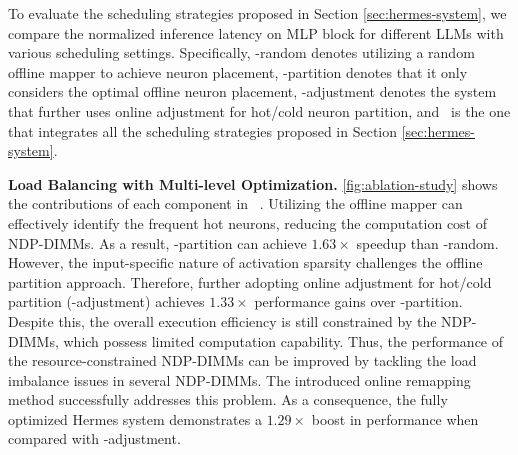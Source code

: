 To evaluate the scheduling strategies proposed in Section \ref{sec:hermes-system}, we compare the normalized inference latency on MLP block for different LLMs with various scheduling settings. Specifically, \name-random denotes utilizing a random offline mapper to achieve neuron placement, \name-partition denotes that it only considers the optimal offline neuron placement, \name-adjustment denotes the system that further uses online adjustment for hot/cold neuron partition, and \name~is the one that integrates all the scheduling strategies proposed in Section \ref{sec:hermes-system}.  

\textbf{Load Balancing with Multi-level Optimization. } \fig \ref{fig:ablation-study} shows the contributions of each component in \name~. Utilizing the offline mapper can effectively identify the frequent hot neurons, reducing the computation cost of NDP-DIMMs. As a result, \name-partition can achieve $1.63 \times$ speedup than \name-random. However, the input-specific nature of activation sparsity challenges the offline partition approach. Therefore, further adopting online adjustment for hot/cold partition (\name-adjustment) achieves $1.33 \times$ performance gains over \name-partition. Despite this, the overall execution efficiency is still constrained by the NDP-DIMMs, which possess limited computation capability. Thus, the performance of the resource-constrained NDP-DIMMs can be improved by tackling the load imbalance issues in several NDP-DIMMs. The introduced online remapping method successfully addresses this problem. As a consequence,
the fully optimized Hermes system demonstrates a $1.29 \times$ boost in performance when compared with \name-adjustment.


